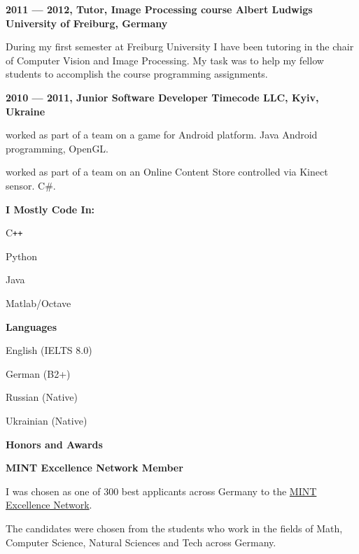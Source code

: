 \documentclass[a4paper,12pt,final]{memoir}
\newcommand{\Sep}{\vspace{1.5em}}
\newcommand{\SmallSep}{\vspace{0.5em}}
\newcommand{\CVSection}[1]
	{\Large\textbf{#1}\par
	\SmallSep\normalsize\normalfont}
\newcommand{\CVItem}[1]
	{\textbf{\color{MidnightBlue} #1}}
\begin{document}
\CVItem{2011 --- 2012, Tutor, Image Processing course
\newline Albert Ludwigs University of Freiburg, Germany}
\begin{compactitem}[\color{RoyalBlue}$\circ$]
\item During my first semester at Freiburg University I have been tutoring in
the chair of Computer Vision and Image Processing. My task was to help my fellow
students to accomplish the course programming assignments.
\end{compactitem}
\SmallSep

\CVItem{2010 --- 2011, Junior Software Developer
\newline Timecode LLC, Kyiv, Ukraine}
\begin{compactitem}[\color{MidnightBlue}$\circ$]
\item worked as part of a team on a game for Android platform. Java Android
programming, OpenGL.\@
\item worked as part of a team on an Online Content Store controlled via Kinect
sensor. C\#.
\end{compactitem}
\SmallSep
\framebreak
\clearpage
\framebreak{}
	\SmallSep{}
	\vspace{-2mm}

	\CVSection{I Mostly Code In:}
	\begin{compactitem}[\color{MidnightBlue}$\circ$]
		\item C\texttt{++}
		\item Python
		\item Java
		\item Matlab/Octave
	\end{compactitem}
	\Sep{}

	\CVSection{Languages}
	\begin{compactitem}[\color{MidnightBlue}$\circ$]
		\item English (IELTS 8.0)
		\item German (B2+)
		\item Russian (Native)
		\item Ukrainian (Native)
	\end{compactitem}
	\Sep{}

	\CVSection{Honors and Awards}
	\CVItem{MINT Excellence Network Member}
	\begin{compactitem}[\color{MidnightBlue}$\circ$]
		\item I was chosen as one of 300 best applicants across Germany to the
		\href{http://www.mlp.de/#/studenten/karriere/stipendienprogramme/mint-excellence}
		{MINT Excellence Network}.

		The candidates were chosen from the students who work in the fields of Math,
		Computer Science, Natural Sciences and Tech across Germany.
	\end{compactitem}
	\SmallSep{}
\end{document}
